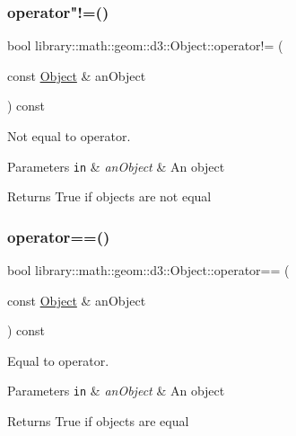 \subsubsection{\texorpdfstring{operator"!=()}{operator!=()}}
{\footnotesize\ttfamily bool library\+::math\+::geom\+::d3\+::\+Object\+::operator!= (\begin{DoxyParamCaption}\item[{const \hyperlink{classlibrary_1_1math_1_1geom_1_1d3_1_1_object}{Object} \&}]{an\+Object }\end{DoxyParamCaption}) const}



Not equal to operator. 


\begin{DoxyParams}[1]{Parameters}
\mbox{\tt in}  & {\em an\+Object} & An object \\
\hline
\end{DoxyParams}
\begin{DoxyReturn}{Returns}
True if objects are not equal 
\end{DoxyReturn}
\mbox{\label{classlibrary_1_1math_1_1geom_1_1d3_1_1_object_a7a68a18bae9709a8cbba5036fd5ad3a0}} 
\subsubsection{\texorpdfstring{operator==()}{operator==()}}
{\footnotesize\ttfamily bool library\+::math\+::geom\+::d3\+::\+Object\+::operator== (\begin{DoxyParamCaption}\item[{const \hyperlink{classlibrary_1_1math_1_1geom_1_1d3_1_1_object}{Object} \&}]{an\+Object }\end{DoxyParamCaption}) const}



Equal to operator. 


\begin{DoxyParams}[1]{Parameters}
\mbox{\tt in}  & {\em an\+Object} & An object \\
\hline
\end{DoxyParams}
\begin{DoxyReturn}{Returns}
True if objects are equal 
\end{DoxyReturn}
\mbox{\label{classlibrary_1_1math_1_1geom_1_1d3_1_1_object_aa166f4ce4d116a248f0fc861c75012ca}} 
